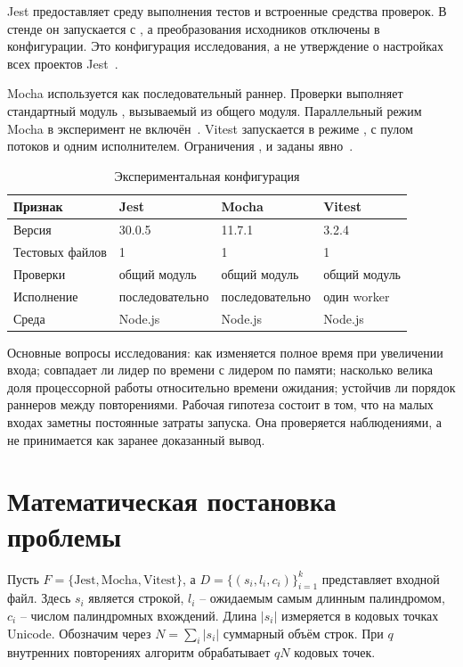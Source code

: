 Jest предоставляет среду выполнения тестов и встроенные средства проверок. В стенде он запускается с , а преобразования исходников отключены в конфигурации. Это конфигурация исследования, а не утверждение о настройках всех проектов Jest~\cite{jest-cli,jest-config}.

Mocha используется как последовательный раннер. Проверки выполняет стандартный модуль , вызываемый из общего модуля. Параллельный режим Mocha в эксперимент не включён~\cite{mocha-cli}. Vitest запускается в режиме , с пулом потоков и одним исполнителем. Ограничения ,  и  заданы явно~\cite{vitest-config}.

\begin{table}[H]\centering\small
\caption{Экспериментальная конфигурация}
\begin{tabularx}{\linewidth}{lXXX}
\toprule
Признак & Jest & Mocha & Vitest\\\midrule
Версия & 30.0.5 & 11.7.1 & 3.2.4\\
Тестовых файлов & 1 & 1 & 1\\
Проверки & общий модуль & общий модуль & общий модуль\\
Исполнение & последовательно & последовательно & один worker\\
Среда & Node.js & Node.js & Node.js\\\bottomrule
\end{tabularx}
\end{table}

Основные вопросы исследования: как изменяется полное время при увеличении входа; совпадает ли лидер по времени с лидером по памяти; насколько велика доля процессорной работы относительно времени ожидания; устойчив ли порядок раннеров между повторениями. Рабочая гипотеза состоит в том, что на малых входах заметны постоянные затраты запуска. Она проверяется наблюдениями, а не принимается как заранее доказанный вывод.

\section{Математическая постановка проблемы}
Пусть $F=\{\mathrm{Jest},\mathrm{Mocha},\mathrm{Vitest}\}$, а
$D=\{(s_i,l_i,c_i)\}_{i=1}^{k}$ представляет входной файл. Здесь $s_i$ является строкой, $l_i$ -- ожидаемым самым длинным палиндромом, $c_i$ -- числом палиндромных вхождений. Длина $|s_i|$ измеряется в кодовых точках Unicode. Обозначим через $N=\sum_i |s_i|$ суммарный объём строк. При $q$ внутренних повторениях алгоритм обрабатывает $qN$ кодовых точек.

